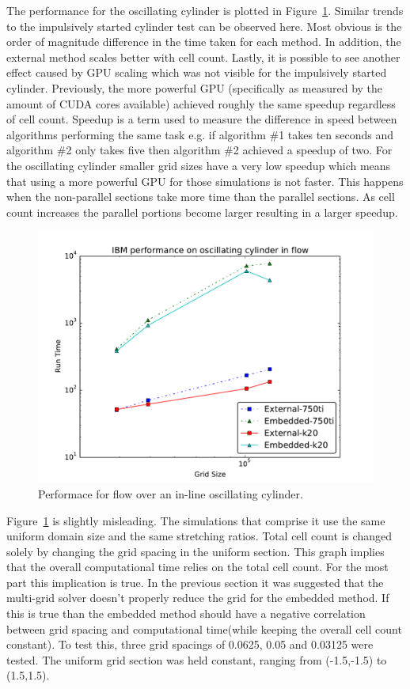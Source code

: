 The performance for the oscillating cylinder is plotted in Figure~\ref{fig:oscperf}. 
Similar trends to the impulsively started cylinder test can be observed here.
Most obvious is the order of magnitude difference in the time taken for each method. 
In addition, the external method scales better with cell count. 
Lastly, it is possible to see another effect caused by GPU scaling which was not visible for the impulsively started cylinder. 
Previously, the more powerful GPU (specifically as measured by the amount of CUDA cores available) achieved roughly the same speedup regardless of cell count. 
Speedup is a term used to measure the difference in speed between algorithms performing the same task e.g. if algorithm \#1 takes ten seconds and algorithm \#2 only takes five then algorithm \#2 achieved a speedup of two. 
For the oscillating cylinder smaller grid sizes have a very low speedup which means that using a more powerful GPU for those simulations is not faster. 
This happens when the non-parallel sections take more time than the parallel sections. 
As cell count increases the parallel portions become larger resulting in a larger speedup. 
\begin{figure}[!htb]
	\centering
	\includegraphics[width=0.4\linewidth]{osc_performance}
	\caption{Performace for flow over an in-line oscillating cylinder.}
	\label{fig:oscperf}
\end{figure}
Figure~\ref{fig:oscperf} is slightly misleading. 
The simulations that comprise it use the same uniform domain size and the same stretching ratios. 
Total cell count is changed solely by changing the grid spacing in the uniform section. 
This graph implies that the overall computational time relies on the total cell count. 
For the most part this implication is true. 
In the previous section it was suggested that the multi-grid solver doesn't properly reduce the grid for the embedded method. 
If this is true than the embedded method should have a negative correlation between grid spacing and computational time(while keeping the overall cell count constant). 
To test this, three grid spacings of 0.0625, 0.05 and 0.03125 were tested. 
The uniform grid section was held constant, ranging from (-1.5,-1.5) to (1.5,1.5). 
